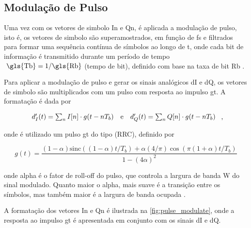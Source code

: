 \subsection{Modulação de Pulso}

Uma vez com os vetores de simbolo \gls{In} e \gls{Qn}, é aplicada a modulação de pulso, isto é, os vetores de simbolo são superamostrados, em função de \gls{fs} e filtrados para formar uma sequência contínua de símbolos ao longo de \gls{t}, onde cada bit de informação é transmitido durante um período de tempo $\text{ \gls{Tb}} = 1/ \text{\gls{Rb}}$ (tempo de bit), definido com base na taxa de bit \gls{Rb} \cite{cnes_services_and_message_formats_ed2_rev2_2006}.


Para aplicar a modulação de pulso e gerar os sinais analógicos \gls{dI} e \gls{dQ}, os vetores de simbolo são multiplicados com um pulso com resposta ao impulso \gls{gt}. A formatação é dada por 

\vspace{-1em}
\begin{equation}
    \begin{array}{c@{\quad\text{e}\quad}c}
        d_I'(t) = \sum_{n} I[n] \cdot g(t - nT_b) &
        d_Q'(t) = \sum_{n} Q[n] \cdot g(t - nT_b)
    \end{array} \text{ ,}
\end{equation}

\noindent onde é utilizado um pulso \gls{gt} do tipo (\gls{RRC}), definido por

\begin{equation}
    g(t) = \frac{(1-\alpha) \text{sinc}((1- \alpha) t / T_b) + \alpha(4/\pi) \cos(\pi(1 + \alpha)t/T_b) }{1 - (4\alpha )^2}
\end{equation}

\noindent onde \gls{alpha} é o fator de roll-off do pulso, que controla a largura de banda \gls{W} do sinal modulado. Quanto maior o \gls{alpha}, mais suave é a transição entre os símbolos, mas também maior é a largura de banda ocupada \cite{10555531840}.

A formatação dos vetores \gls{In} e \gls{Qn} é ilustrada na \autoref{fig:pulse_modulate}, onde a resposta ao impulso \gls{gt} é apresentada em conjunto com os sinais \gls{dI} e \gls{dQ}. 


